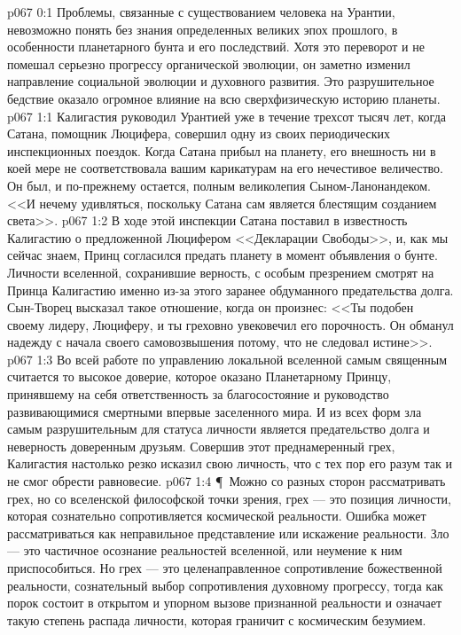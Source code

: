 \vs p067 0:1 Проблемы, связанные с существованием человека на Урантии, невозможно понять без знания определенных великих эпох прошлого, в особенности планетарного бунта и его последствий. Хотя это переворот и не помешал серьезно прогрессу органической эволюции, он заметно изменил направление социальной эволюции и духовного развития. Это разрушительное бедствие оказало огромное влияние на всю сверхфизическую историю планеты.
\vs p067 1:1 Калигастия руководил Урантией уже в течение трехсот тысяч лет, когда Сатана, помощник Люцифера, совершил одну из своих периодических инспекционных поездок. Когда Сатана прибыл на планету, его внешность ни в коей мере не соответствовала вашим карикатурам на его нечестивое величество. Он был, и по\hyp{}прежнему остается, полным великолепия Сыном\hyp{}Ланонандеком. <<И нечему удивляться, поскольку Сатана сам является блестящим созданием света>>.
\vs p067 1:2 В ходе этой инспекции Сатана поставил в известность Калигастию о предложенной Люцифером <<Декларации Свободы>>, и, как мы сейчас знаем, Принц согласился предать планету в момент объявления о бунте. Личности вселенной, сохранившие верность, с особым презрением смотрят на Принца Калигастию именно из\hyp{}за этого заранее обдуманного предательства долга. Сын\hyp{}Творец высказал такое отношение, когда он произнес: <<Ты подобен своему лидеру, Люциферу, и ты греховно увековечил его порочность. Он обманул надежду с начала своего самовозвышения потому, что не следовал истине>>.
\vs p067 1:3 Во всей работе по управлению локальной вселенной самым священным считается то высокое доверие, которое оказано Планетарному Принцу, принявшему на себя ответственность за благосостояние и руководство развивающимися смертными впервые заселенного мира. И из всех форм зла самым разрушительным для статуса личности является предательство долга и неверность доверенным друзьям. Совершив этот преднамеренный грех, Калигастия настолько резко исказил свою личность, что с тех пор его разум так и не смог обрести равновесие.
\vs p067 1:4 \P\ Можно со разных сторон рассматривать грех, но со вселенской философской точки зрения, грех --- это позиция личности, которая сознательно сопротивляется космической реальности. Ошибка может рассматриваться как неправильное представление или искажение реальности. Зло --- это частичное осознание реальностей вселенной, или неумение к ним приспособиться. Но грех --- это целенаправленное сопротивление божественной реальности, сознательный выбор сопротивления духовному прогрессу, тогда как порок состоит в открытом и упорном вызове признанной реальности и означает такую степень распада личности, которая граничит с космическим безумием.
